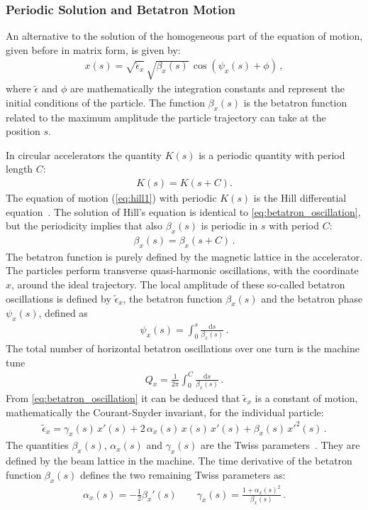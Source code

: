 \subsubsection{Periodic Solution and Betatron Motion}
An alternative to the solution of the homogeneous part of the equation of motion, given before in matrix form, is given by: 
%
\begin{align}
x(s) = \sqrt{\tilde{\epsilon}_x} \, \sqrt{\beta_x(s)} \, \cos \left( \psi_x(s) + \phi \right) \, , \label{eq:betatron_oscillation}
\end{align}
%
where $\tilde{\epsilon}$ and $\phi$ are mathematically the integration constants and represent the initial conditions of the particle. The function $\beta_x(s)$ is the betatron function related to the maximum amplitude the particle trajectory can take at the position $s$. 

In circular accelerators the quantity $K(s)$ is a periodic quantity with period length $C$:
\begin{align}
K(s) = K(s+C) .
\end{align}
The equation of motion (\ref{eq:hill1}) with periodic $K(s)$ is the Hill differential equation~\cite{wiedemann1999particle}. The solution of Hill's equation is identical to \eqref{eq:betatron_oscillation}, but the periodicity implies that also $\beta_x(s)$ is periodic in $s$ with period $C$:
%
\begin{align}
  \beta_x (s) = \beta_x (s+C) \, .
\end{align}
The betatron function is purely defined by the magnetic lattice in the accelerator. The particles perform transverse quasi-harmonic oscillations, with the coordinate $x$, around the ideal trajectory. The local amplitude of these so-called betatron oscillations is defined by $\tilde{\epsilon}_x$, the betatron function $\beta_x(s)$ and the betatron phase $\psi_x(s)$, defined as
%
\begin{align}
  \psi_x(s) = \int_0^s \frac{\mathrm{d}s}{\beta_x(s)} \, .
\end{align}
%
The total number of horizontal betatron oscillations over one turn is the machine tune
%
\begin{align}
  Q_x = \frac{1}{2 \pi} \int_0^C \frac{\mathrm{d}s}{\beta_x(s)} \, .
\end{align}
%
%
From \eqref{eq:betatron_oscillation} it can be deduced that $\tilde{\epsilon}_x$ is a constant of motion, mathematically the Courant-Snyder invariant, for the individual particle:
%
\begin{align}
\tilde{\epsilon}_x = \gamma_x(s) \, x'(s) + 2 \, \alpha_x(s) \, x(s) \, x'(s) + \beta_x(s) \, x'^2 (s) \, . \label{eq:parameric_ellipse}
\end{align}
%
The quantities $\beta_x(s)$, $\alpha_x(s)$ and $\gamma_x(s)$ are the Twiss parameters~\cite{wiedemann1999particle}. They are defined by the beam lattice in the machine. The time derivative of the betatron function $\beta_x(s)$ defines the two remaining Twiss parameters as:
\begin{align}
\alpha_x(s) = - \frac{1}{2} \beta_x'(s) \quad \quad \gamma_x(s) = \frac{1+\alpha_x(s)^2}{\beta_x(s)} \, .
\end{align}

